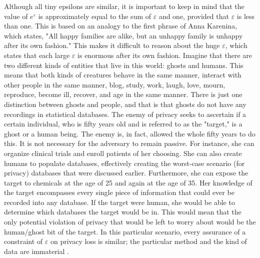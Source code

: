 Although all tiny epsilons are similar, it is important to keep in mind that the value of $e^\varepsilon$ is approximately equal to the sum of $\varepsilon$ and one, provided that $\varepsilon$ is less than one. This is based on an analogy to the first phrase of Anna Karenina, which states, "All happy families are alike, but an unhappy family is unhappy after its own fashion." This makes it difficult to reason about the huge $\varepsilon$, which states that each large $\varepsilon$ is enormous after its own fashion. Imagine that there are two different kinds of entities that live in this world: ghosts and humans. This means that both kinds of creatures behave in the same manner, interact with other people in the same manner, blog, study, work, laugh, love, mourn, reproduce, become ill, recover, and age in the same manner. There is just one distinction between ghosts and people, and that is that ghosts do not have any recordings in statistical databases. The enemy of privacy seeks to ascertain if a certain individual, who is fifty years old and is referred to as the "target," is a ghost or a human being. The enemy is, in fact, allowed the whole fifty years to do this. It is not necessary for the adversary to remain passive. For instance, she can organize clinical trials and enroll patients of her choosing. She can also create humans to populate databases, effectively creating the worst-case scenario (for privacy) databases that were discussed earlier. Furthermore, she can expose the target to chemicals at the age of 25 and again at the age of 35. Her knowledge of the target encompasses every single piece of information that could ever be recorded into any database. If the target were human, she would be able to determine which databases the target would be in. This would mean that the only potential violation of privacy that would be left to worry about would be the human/ghost bit of the target. In this particular scenario, every assurance of a constraint of  $\varepsilon$ on privacy loss is similar; the particular method and the kind of data are immaterial \cite{DWORK2019}.

